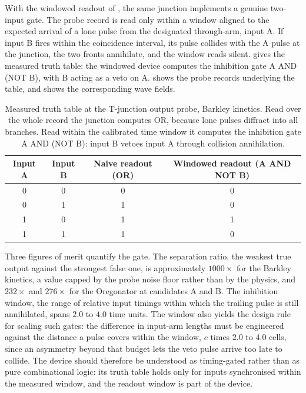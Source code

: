 With the windowed readout of , the same junction implements a genuine two-input gate.
The probe record is read only within a window aligned to the expected arrival of a lone pulse from the designated through-arm, input A.
If input B fires within the coincidence interval, its pulse collides with the A pulse at the junction, the two fronts annihilate, and the window reads silent.
 gives the measured truth table: the windowed device computes the inhibition gate A AND (NOT B), with B acting as a veto on A.
 shows the probe records underlying the table, and  shows the corresponding wave fields.

\begin{table}[htbp]
\centering
\caption{Measured truth table at the T-junction output probe, Barkley kinetics. Read over the whole record the junction computes OR, because lone pulses diffract into all branches. Read within the calibrated time window it computes the inhibition gate A AND (NOT B): input B vetoes input A through collision annihilation.}
\label{tab:res_truth}
\small
\begin{tabular}{@{}cccc@{}}
\toprule
\textbf{Input A} & \textbf{Input B} & \textbf{Naive readout (OR)} & \textbf{Windowed readout (A AND NOT B)} \\
\midrule
0 & 0 & 0 & 0 \\
0 & 1 & 1 & 0 \\
1 & 0 & 1 & 1 \\
1 & 1 & 1 & 0 \\
\bottomrule
\end{tabular}
\end{table}

Three figures of merit quantify the gate.
The separation ratio, the weakest true output against the strongest false one, is approximately $1000\times$ for the Barkley kinetics, a value capped by the probe noise floor rather than by the physics, and $232\times$ and $276\times$ for the Oregonator at candidates A and B.
The inhibition window, the range of relative input timings within which the trailing pulse is still annihilated, spans $2.0$ to $4.0$ time units.
The window also yields the design rule for scaling such gates: the difference in input-arm lengths must be engineered against the distance a pulse covers within the window, $c$ times $2.0$ to $4.0$ cells, since an asymmetry beyond that budget lets the veto pulse arrive too late to collide.
The device should therefore be understood as timing-gated rather than as pure combinational logic: its truth table holds only for inputs synchronised within the measured window, and the readout window is part of the device.

